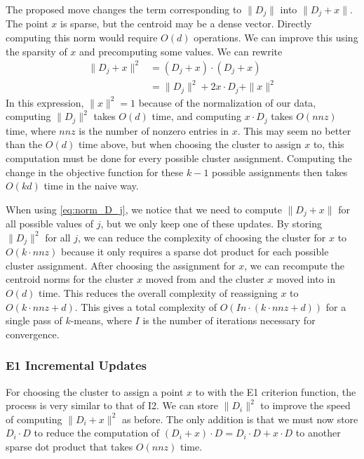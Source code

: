 \documentclass[11pt]{article}
\begin{document}
        The proposed move changes the term corresponding to $\| D_j \|$ into $\| D_j + x \|$. The point $x$ is sparse, but the centroid may be a dense
        vector. Directly computing this norm would require $O(d)$ operations. We can improve this using the sparsity of $x$ and precomputing some
        values. We can rewrite
        \begin{align}
          \| D_j + x \|^2 &= (D_j + x) \cdot (D_j + x) \nonumber \\
          &= \| D_j \|^2 + 2 x \cdot D_j + \|x\|^2
          \label{eq:norm_D_j}
        \end{align}
        In this expression, $\|x\|^2 = 1$ because of the normalization of our data, computing $\|D_j\|^2$ takes $O(d)$ time, and computing $x \cdot
        D_j$ takes $O(nnz)$ time, where $nnz$ is the number of nonzero entries in $x$. This may seem no better than the $O(d)$ time above, but when
        choosing the cluster to assign $x$ to, this computation must be done for every possible cluster assignment. Computing the change in the
        objective function for these $k-1$ possible assignments then takes $O(k d)$ time in the naive way.

        When using \eqref{eq:norm_D_j}, we notice that we need to compute $\|D_j + x\|$ for all possible values of $j$, but we only keep one of these
        updates. By storing $\| D_j \|^2$ for all $j$, we can reduce the complexity of choosing the cluster for $x$ to $O(k \cdot nnz)$ because it
        only requires a sparse dot product for each possible cluster assignment. After choosing the assignment for $x$, we can recompute the centroid
        norms for the cluster $x$ moved from and the cluster $x$ moved into in $O(d)$ time. This reduces the overall complexity of reassigning $x$ to
        $O( k \cdot nnz + d )$. This gives a total complexity of $O( I n \cdot (k \cdot nnz + d) )$ for a single pass of $k$-means, where $I$ is the
        number of iterations necessary for convergence.

        \subsubsection{E1 Incremental Updates}
        For choosing the cluster to assign a point $x$ to with the E1 criterion function, the process is very similar to that of I2. We can store
        $\|D_i\|^2$ to improve the speed of computing $\| D_i + x \|^2$ as before. The only addition is that we must now store $D_i \cdot D$ to reduce
        the computation of $(D_i + x) \cdot D = D_i \cdot D + x \cdot D$ to another sparse dot product that takes $O(nnz)$ time.
\end{document}
